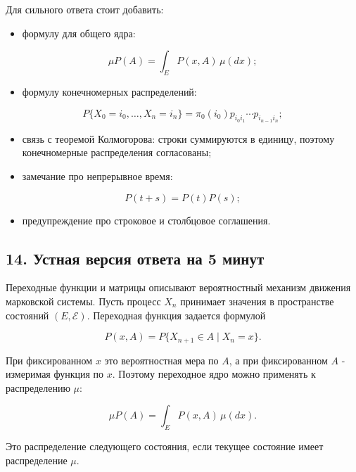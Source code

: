 \documentclass[
  11pt,
  a4paper,
]{article}
\providecommand{\tightlist}{%
  \setlength{\itemsep}{0pt}\setlength{\parskip}{0pt}}
\begin{document}
Для сильного ответа стоит добавить:

\begin{itemize}
\tightlist
\item
  формулу для общего ядра:
\end{itemize}

\[
\mu P(A)=\int_E P(x,A)\,\mu(dx);
\]

\begin{itemize}
\tightlist
\item
  формулу конечномерных распределений:
\end{itemize}

\[
P\{X_0=i_0,\ldots,X_n=i_n\}
=
\pi_0(i_0)p_{i_0i_1}\cdots p_{i_{n-1}i_n};
\]

\begin{itemize}
\tightlist
\item
  связь с теоремой Колмогорова: строки суммируются в единицу, поэтому
  конечномерные распределения согласованы;
\item
  замечание про непрерывное время:
\end{itemize}

\[
P(t+s)=P(t)P(s);
\]

\begin{itemize}
\tightlist
\item
  предупреждение про строковое и столбцовое соглашения.
\end{itemize}

\subsection{14. Устная версия ответа на 5
минут}\label{ux443ux441ux442ux43dux430ux44f-ux432ux435ux440ux441ux438ux44f-ux43eux442ux432ux435ux442ux430-ux43dux430-5-ux43cux438ux43dux443ux442}

Переходные функции и матрицы описывают вероятностный механизм движения
марковской системы. Пусть процесс \(X_n\) принимает значения в
пространстве состояний \((E,\mathcal E)\). Переходная функция задается
формулой

\[
P(x,A)=P\{X_{n+1}\in A\mid X_n=x\}.
\]

При фиксированном \(x\) это вероятностная мера по \(A\), а при
фиксированном \(A\) - измеримая функция по \(x\). Поэтому переходное
ядро можно применять к распределению \(\mu\):

\[
\mu P(A)=\int_E P(x,A)\,\mu(dx).
\]

Это распределение следующего состояния, если текущее состояние имеет
распределение \(\mu\).
\end{document}
